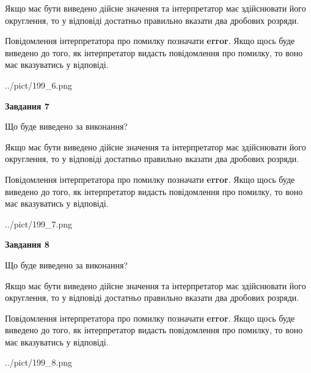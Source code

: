 \documentclass[12pt, ukrainian]{article}
\begin{document}
{\begin {Large}
Якщо має бути виведено дійсне значення та інтерпретатор має здійснювати його округлення, 
то у відповіді достатньо правильно вказати два дробових розряди.

Повідомлення інтерпретатора про помилку позначати \textbf{error}.
Якщо щось буде виведено до того, як інтерпретатор видасть повідомлення про помилку, 
то воно має вказуватись у відповіді. \par

\begin{center}
	{../pict/199_6.png}
\end{center}
\newpage

{\begin {center}\textbf{Завдання 7}\end {center}}\par
Що буде виведено за виконання? \par

Якщо має бути виведено дійсне значення та інтерпретатор має здійснювати його округлення, 
то у відповіді достатньо правильно вказати два дробових розряди.

Повідомлення інтерпретатора про помилку позначати \textbf{error}.
Якщо щось буде виведено до того, як інтерпретатор видасть повідомлення про помилку, 
то воно має вказуватись у відповіді. \par

\begin{center}
	{../pict/199_7.png}
\end{center}
\newpage

{\begin {center}\textbf{Завдання 8}\end {center}}\par
Що буде виведено за виконання? \par

Якщо має бути виведено дійсне значення та інтерпретатор має здійснювати його округлення, 
то у відповіді достатньо правильно вказати два дробових розряди.

Повідомлення інтерпретатора про помилку позначати \textbf{error}.
Якщо щось буде виведено до того, як інтерпретатор видасть повідомлення про помилку, 
то воно має вказуватись у відповіді. \par

\begin{center}
	{../pict/199_8.png}
\end{center}
\newpage


\end{Large}}
\end{document}
